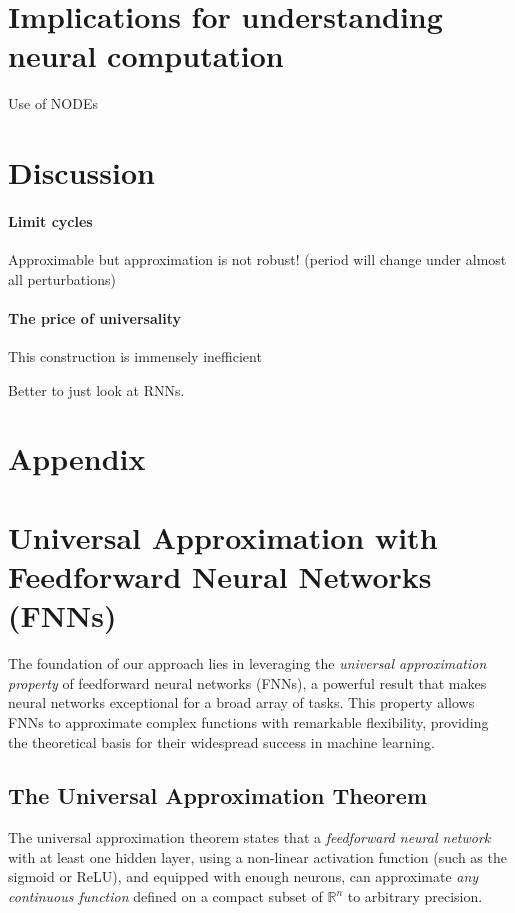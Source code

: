 \documentclass{article}
\theoremstyle{definition}
\theoremstyle{remark}
\begin{document}
\section{Implications for understanding neural computation}

Use of NODEs \citep{kim2021inferring}




\section{Discussion}


\paragraph{Limit cycles}
Approximable but approximation is not robust! (period will change under almost all perturbations)

\paragraph{The price of universality}
This construction is immensely inefficient

Better to just look at RNNs. 



\newpage




\newpage
\section*{Appendix}
\section{Universal Approximation with Feedforward Neural Networks (FNNs)}

The foundation of our approach lies in leveraging the \textit{universal approximation property} of feedforward neural networks (FNNs), a powerful result that makes neural networks exceptional for a broad array of tasks. This property allows FNNs to approximate complex functions with remarkable flexibility, providing the theoretical basis for their widespread success in machine learning.

\subsection{The Universal Approximation Theorem}

The universal approximation theorem states that a \textit{feedforward neural network} with at least one hidden layer, using a non-linear activation function (such as the sigmoid or ReLU), and equipped with enough neurons, can approximate \textit{any continuous function} defined on a compact subset of \(\mathbb{R}^n\) to arbitrary precision.
\end{document}
